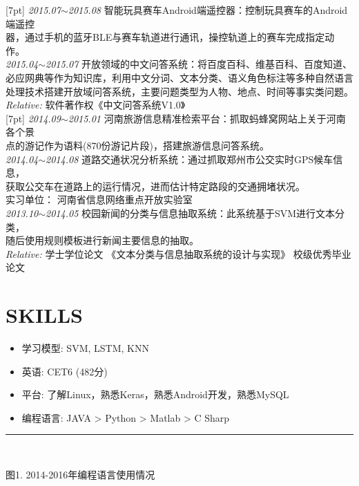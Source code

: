 \documentclass[line, margin]{res}
\newcommand{\xiaowu}{\fontsize{9pt}{15.75pt}\selectfont} %
\begin{document}
\begin{resume}
{[7pt]
 {\sl 2015.07$\sim$2015.08} 智能玩具赛车Android端遥控器：{ 控制玩具赛车的Android端遥控\\
 器，通过手机的蓝牙BLE与赛车轨道进行通讯，操控轨道上的赛车完成指定动作。}\\
[7pt]
 {\sl 2015.04$\sim$2015.07} 开放领域的中文问答系统：{ 将百度百科、维基百科、百度知道、\\
 必应网典等作为知识库，利用中文分词、文本分类、语义角色标注等多种自然语言\\
 处理技术搭建开放域问答系统，主要问题类型为人物、地点、时间等事实类问题。}\\ 
 {\sl\xiaowu Relative:} {\xiaowu 软件著作权《中文问答系统V1.0》} \\
[7pt]
 {\sl 2014.09$\sim$2015.01} 河南旅游信息精准检索平台：{ 抓取蚂蜂窝网站上关于河南各个景\\
 点的游记作为语料(870份游记片段)，搭建旅游信息问答系统。} \\
[7pt]
 {\sl 2014.04$\sim$2014.08} 道路交通状况分析系统：{ 通过抓取郑州市公交实时GPS候车信息，\\
 获取公交车在道路上的运行情况，进而估计特定路段的交通拥堵状况。 \\
 {\xiaowu 实习单位： 河南省信息网络重点开放实验室} }\\
[7pt]
 {\sl 2013.10$\sim$2014.05} 校园新闻的分类与信息抽取系统：{ 此系统基于SVM进行文本分类，\\
 随后使用规则模板进行新闻主要信息的抽取。}\\
   {\sl\xiaowu Relative:} {\xiaowu 学士学位论文 《文本分类与信息抽取系统的设计与实现》 校级优秀毕业论文}} \\
 
\section{SKILLS}
\begin{itemize}
\item { 学习模型: }SVM, LSTM, KNN
\item { 英语: CET6 (482分)}
\item { 平台: 了解Linux，熟悉Keras，熟悉Android开发，熟悉MySQL}
\item { 编程语言: }JAVA > Python > Matlab > C Sharp
\end{itemize}

\rule{13.0cm}{0.05em} \\
\begin{center}
{\xiaowu 图1. 2014-2016年编程语言使用情况}
\end{center}


\end{resume}
\end{document}
